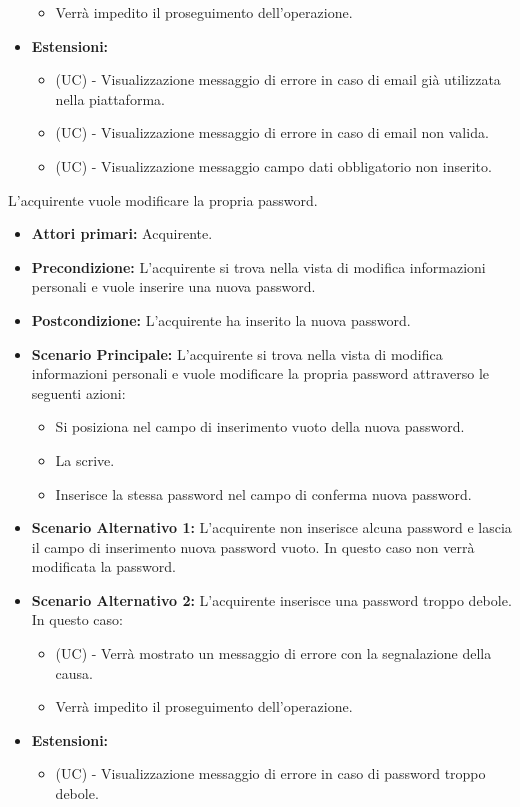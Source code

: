 \begin{itemize}
\begin{itemize}
        \item Verrà impedito il proseguimento dell'operazione.
    \end{itemize}
    \item \textbf{Estensioni:}
    \begin{itemize}
        \item (UC) - Visualizzazione messaggio di errore in caso di email già utilizzata nella piattaforma.
        \item (UC) - Visualizzazione messaggio di errore in caso di email non valida.
        \item (UC) - Visualizzazione messaggio campo dati obbligatorio non inserito.
    \end{itemize}
\end{itemize}

L'acquirente vuole modificare la propria password.
\begin{itemize}
    \item \textbf{Attori primari:} Acquirente.
    \item \textbf{Precondizione:} L'acquirente si trova nella vista di modifica informazioni personali e vuole inserire una nuova password.
    \item \textbf{Postcondizione:} L'acquirente ha inserito la nuova password.
    \item \textbf{Scenario Principale:} L'acquirente si trova nella vista di modifica informazioni personali e vuole modificare la propria password attraverso le seguenti azioni:
        \begin{itemize}
            \item Si posiziona nel campo di inserimento vuoto della nuova password.
            \item La scrive.
            \item Inserisce la stessa password nel campo di conferma nuova password.
        \end{itemize}
    \item \textbf{Scenario Alternativo 1:} L'acquirente non inserisce alcuna password e lascia il campo di inserimento nuova password vuoto. In questo caso non verrà modificata la password.
    \item \textbf{Scenario Alternativo 2:} L'acquirente inserisce una password troppo debole. In questo caso:
    \begin{itemize}
        \item (UC) - Verrà mostrato un messaggio di errore con la segnalazione della causa.
        \item Verrà impedito il proseguimento dell'operazione.
    \end{itemize}
    \item \textbf{Estensioni:}
    \begin{itemize}
        \item (UC) - Visualizzazione messaggio di errore in caso di password troppo debole.
    \end{itemize}
\end{itemize}

